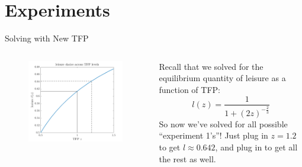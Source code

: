 \documentclass[11pt,aspectratio=43]{beamer}
\theoremstyle{definition}
\begin{document}
\section{Experiments}
\label{sec:Experiments}

\begin{frame}{Solving with New TFP}
\label{slide:Solving_with_New_TFP}
    \begin{columns}
        \begin{column}{0.5\textwidth}
            \begin{figure}
                \includegraphics[width=\textwidth]{./figures/TFPsolveSPP.png}
            \end{figure}
        \end{column}
        \begin{column}{0.5\textwidth}
            Recall that we solved for the equilibrium quantity of leisure as a function of TFP:
            \begin{equation}
            \label{eq:leisure}
                l( z ) = \frac{1}{1 + ( 2z )^{-\frac{2}{3}}}
            \end{equation}
            So now we’ve solved for all possible ``experiment 1’s''! Just plug in $ z = 1.2 $ to get $ l \approx 0.642 $, and plug in to get all the rest as well.
        \end{column}
    \end{columns}
\end{frame}
\end{document}
